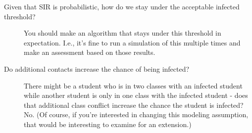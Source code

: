 \documentclass[12pt]{article}
\begin{document}
\begin{description}
\item[Given that SIR is probabilistic, how do we stay under the acceptable infected threshold?]  You should make an algorithm that stays under this threshold in expectation.  I.e., it's fine to run a simulation of this multiple times and make an assessment based on those results.
\item[Do additional contacts increase the chance of being infected?] There might be a student who is in two classes with an infected student while another student is only in one class with the infected student - does that additional class conflict increase the chance the student is infected?  No.  (Of course, if you're interested in changing this modeling assumption, that would be interesting to examine for an extension.)
\end{description}
\end{document}
